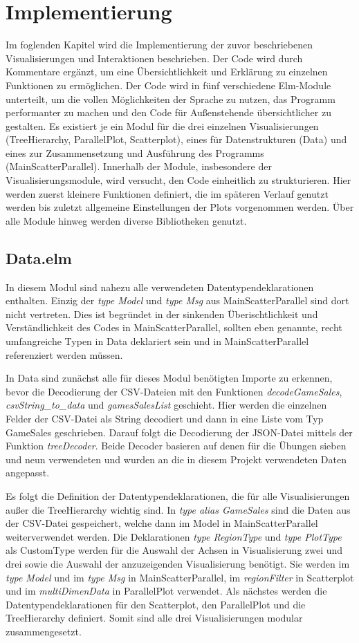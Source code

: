 \documentclass[usegeometry=true]{scrartcl}
\begin{document}
\section{Implementierung}
Im foglenden Kapitel wird die Implementierung der zuvor beschriebenen Visualisierungen und Interaktionen beschrieben. Der Code wird durch Kommentare ergänzt, um eine Übersichtlichkeit und Erklärung zu einzelnen Funktionen zu ermöglichen.
Der Code wird in fünf verschiedene Elm-Module unterteilt, um die vollen Möglichkeiten der Sprache zu nutzen, das Programm performanter zu machen und den Code für Außenstehende übersichtlicher zu gestalten.
Es existiert je ein Modul für die drei einzelnen Visualisierungen (TreeHierarchy, ParallelPlot, Scatterplot), eines für Datenstrukturen (Data) und eines zur Zusammensetzung und Ausführung des Programms (MainScatterParallel). 
Innerhalb der Module, insbesondere der Visualisierungsmodule, wird versucht, den Code einheitlich zu strukturieren. Hier werden zuerst kleinere Funktionen definiert, die im späteren Verlauf genutzt werden bis zuletzt allgemeine Einstellungen der Plots vorgenommen werden. 
Über alle Module hinweg werden diverse Bibliotheken genutzt. 

\subsection{Data.elm}
In diesem Modul sind nahezu alle verwendeten Datentypendeklarationen enthalten. Einzig der \textit{type Model} und \textit{type Msg} aus MainScatterParallel sind dort nicht vertreten. 
Dies ist begründet in der sinkenden Überischtlichkeit und Verständlichkeit des Codes in MainScatterParallel, sollten eben genannte, recht umfangreiche Typen in Data deklariert sein und in MainScatterParallel referenziert werden müssen.

In Data sind zunächst alle für dieses Modul benötigten Importe zu erkennen, bevor die Decodierung der CSV-Dateien mit den Funktionen \textit{decodeGameSales}, \textit{csvString_to_data} und \textit{gamesSalesList} geschieht. 
Hier werden die einzelnen Felder der CSV-Datei als String decodiert und dann in eine Liste vom Typ GameSales geschrieben.
Darauf folgt die Decodierung der JSON-Datei mittels der Funktion \textit{treeDecoder}.
Beide Decoder basieren auf denen für die Übungen sieben und neun verwendeten und wurden an die in diesem Projekt verwendeten Daten angepasst.

Es folgt die Definition der Datentypendeklarationen, die für alle Visualisierungen außer die TreeHierarchy wichtig sind. 
In \textit{type alias GameSales} sind die Daten aus der CSV-Datei gespeichert, welche dann im Model in MainScatterParallel weiterverwendet werden. 
Die Deklarationen \textit{type RegionType} und \textit{type PlotType} als CustomType werden für die Auswahl der Achsen in Visualisierung zwei und drei sowie die Auswahl der anzuzeigenden Visualisierung benötigt.
Sie werden im \textit{type Model} und im \textit{type Msg} in MainScatterParallel, im \textit{regionFilter} in Scatterplot und im \textit{multiDimenData} in ParallelPlot verwendet. 
Als nächstes werden die Datentypendeklarationen für den Scatterplot, den ParallelPlot und die TreeHierarchy definiert. 
Somit sind alle drei Visualisierungen modular zusammengesetzt.
\end{document}
